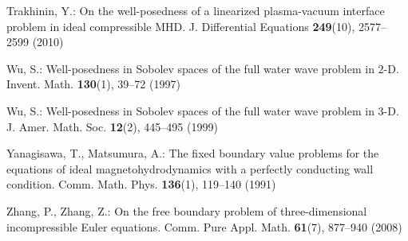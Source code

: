 \documentclass[12pt,reqno]{amsart}
\numberwithin{equation}{section}
\theoremstyle{definition}
\theoremstyle{remark}
\begin{document}
\begin{thebibliography}{10}
Trakhinin, Y.: On the well-posedness of a linearized plasma-vacuum interface
  problem in ideal compressible {MHD}.
\newblock J. Differential Equations \textbf{249}(10), 2577--2599 (2010)

Wu, S.: Well-posedness in {S}obolev spaces of the full water wave problem in
  {$2$}-{D}.
\newblock Invent. Math. \textbf{130}(1), 39--72 (1997)

Wu, S.: Well-posedness in {S}obolev spaces of the full water wave problem in
  3-{D}.
\newblock J. Amer. Math. Soc. \textbf{12}(2), 445--495 (1999)

Yanagisawa, T., Matsumura, A.: The fixed boundary value problems for the
  equations of ideal magnetohydrodynamics with a perfectly conducting wall
  condition.
\newblock Comm. Math. Phys. \textbf{136}(1), 119--140 (1991)

Zhang, P., Zhang, Z.: On the free boundary problem of three-dimensional
  incompressible {E}uler equations.
\newblock Comm. Pure Appl. Math. \textbf{61}(7), 877--940 (2008)

\end{thebibliography}
\end{document}
